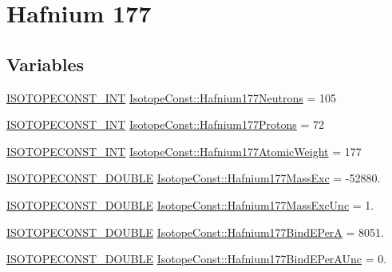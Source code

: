 \hypertarget{group___isotope_const-_hafnium-_hf177}{}\section{Hafnium 177}
\label{group___isotope_const-_hafnium-_hf177}
\subsection*{Variables}
\begin{DoxyCompactItemize}
\item 
\mbox{\hyperlink{group___isotope_const-_macros_ga5f18360b3e99483a35c32d789e62621c}{I\+S\+O\+T\+O\+P\+E\+C\+O\+N\+S\+T\+\_\+\+I\+NT}} \mbox{\hyperlink{group___isotope_const-_hafnium-_hf177_ga20fb6a6a4cd2b4cd387369305aeaa1da}{Isotope\+Const\+::\+Hafnium177\+Neutrons}} = 105
\item 
\mbox{\hyperlink{group___isotope_const-_macros_ga5f18360b3e99483a35c32d789e62621c}{I\+S\+O\+T\+O\+P\+E\+C\+O\+N\+S\+T\+\_\+\+I\+NT}} \mbox{\hyperlink{group___isotope_const-_hafnium-_hf177_ga07189e81939b8a0b9565be9452629f35}{Isotope\+Const\+::\+Hafnium177\+Protons}} = 72
\item 
\mbox{\hyperlink{group___isotope_const-_macros_ga5f18360b3e99483a35c32d789e62621c}{I\+S\+O\+T\+O\+P\+E\+C\+O\+N\+S\+T\+\_\+\+I\+NT}} \mbox{\hyperlink{group___isotope_const-_hafnium-_hf177_gaf784e52abf10029447f34501dd7659f0}{Isotope\+Const\+::\+Hafnium177\+Atomic\+Weight}} = 177
\item 
\mbox{\hyperlink{group___isotope_const-_macros_ga8f45a7272ce02c0b4c65c44636ed719a}{I\+S\+O\+T\+O\+P\+E\+C\+O\+N\+S\+T\+\_\+\+D\+O\+U\+B\+LE}} \mbox{\hyperlink{group___isotope_const-_hafnium-_hf177_gaa566d89b7a1cfa4e40d5d165f8533bf5}{Isotope\+Const\+::\+Hafnium177\+Mass\+Exc}} = -\/52880.
\item 
\mbox{\hyperlink{group___isotope_const-_macros_ga8f45a7272ce02c0b4c65c44636ed719a}{I\+S\+O\+T\+O\+P\+E\+C\+O\+N\+S\+T\+\_\+\+D\+O\+U\+B\+LE}} \mbox{\hyperlink{group___isotope_const-_hafnium-_hf177_gada9ab77f589a5ef82868d78a850202f7}{Isotope\+Const\+::\+Hafnium177\+Mass\+Exc\+Unc}} = 1.
\item 
\mbox{\hyperlink{group___isotope_const-_macros_ga8f45a7272ce02c0b4c65c44636ed719a}{I\+S\+O\+T\+O\+P\+E\+C\+O\+N\+S\+T\+\_\+\+D\+O\+U\+B\+LE}} \mbox{\hyperlink{group___isotope_const-_hafnium-_hf177_ga0f27e4e0454709c84802233e4cb00a29}{Isotope\+Const\+::\+Hafnium177\+Bind\+E\+PerA}} = 8051.
\item 
\mbox{\hyperlink{group___isotope_const-_macros_ga8f45a7272ce02c0b4c65c44636ed719a}{I\+S\+O\+T\+O\+P\+E\+C\+O\+N\+S\+T\+\_\+\+D\+O\+U\+B\+LE}} \mbox{\hyperlink{group___isotope_const-_hafnium-_hf177_ga53746d28e3ee9f2cb587f6bb7d847bd7}{Isotope\+Const\+::\+Hafnium177\+Bind\+E\+Per\+A\+Unc}} = 0.

\end{DoxyCompactItemize}
